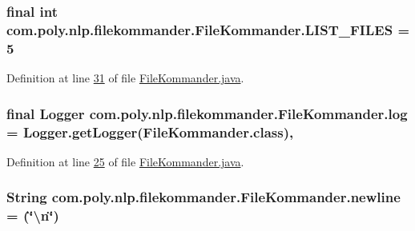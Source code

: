 \hypertarget{classcom_1_1poly_1_1nlp_1_1filekommander_1_1_file_kommander_a682faeb610efe2c1a1d8f9c20d972d82}{
\subsubsection[{L\-I\-S\-T\-\_\-\-F\-I\-L\-E\-S}]{\setlength{\rightskip}{0pt plus 5cm}final int com.\-poly.\-nlp.\-filekommander.\-File\-Kommander.\-L\-I\-S\-T\-\_\-\-F\-I\-L\-E\-S = 5\hspace{0.3cm}{\ttfamily [static]}}}\label{classcom_1_1poly_1_1nlp_1_1filekommander_1_1_file_kommander_a682faeb610efe2c1a1d8f9c20d972d82}


Definition at line \hyperlink{L31}{31} of file \hyperlink{}{File\-Kommander.\-java}.

\hypertarget{classcom_1_1poly_1_1nlp_1_1filekommander_1_1_file_kommander_a5f984d5ddadc6bc7206d293382ee298e}{
\subsubsection[{log}]{\setlength{\rightskip}{0pt plus 5cm}final Logger com.\-poly.\-nlp.\-filekommander.\-File\-Kommander.\-log = Logger.\-get\-Logger(File\-Kommander.\-class)\hspace{0.3cm}{\ttfamily [static]}, {\ttfamily [private]}}}\label{classcom_1_1poly_1_1nlp_1_1filekommander_1_1_file_kommander_a5f984d5ddadc6bc7206d293382ee298e}


Definition at line \hyperlink{L25}{25} of file \hyperlink{}{File\-Kommander.\-java}.

\hypertarget{classcom_1_1poly_1_1nlp_1_1filekommander_1_1_file_kommander_a0076b66fb48530c9171b3c7294e17ce1}{
\subsubsection[{newline}]{\setlength{\rightskip}{0pt plus 5cm}String com.\-poly.\-nlp.\-filekommander.\-File\-Kommander.\-newline = (\char`\"{}\textbackslash{}n\char`\"{})\hspace{0.3cm}{\ttfamily [static]}}}\label{classcom_1_1poly_1_1nlp_1_1filekommander_1_1_file_kommander_a0076b66fb48530c9171b3c7294e17ce1}


